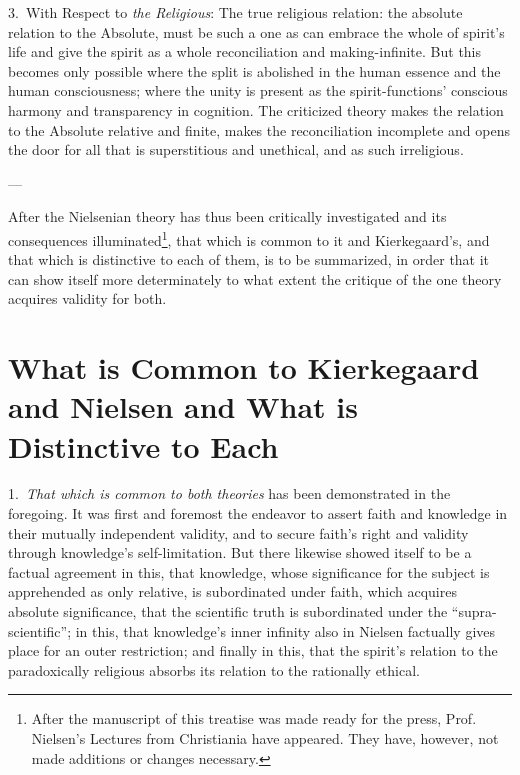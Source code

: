 \documentclass[12pt,a4paper]{book}
\begin{document}
3.~With Respect to \emph{the Religious}: The true religious relation: the absolute relation to the
Absolute, must be such a one as can embrace the whole of spirit's life and give the spirit as a whole
reconciliation and making-infinite. But this becomes only possible where the split is abolished in the
human essence and the human consciousness; where the unity is present as the spirit-functions' conscious
harmony and transparency in cognition. The criticized theory makes the relation to the Absolute relative
and finite, makes the reconciliation incomplete and opens the door for all that is superstitious and
unethical, and as such irreligious.

\begin{center}---\end{center}

After the Nielsenian theory has thus been critically investigated and its consequences
illuminated\footnote{After the manuscript of this treatise was made ready for the press, Prof. Nielsen's
Lectures from Christiania have appeared. They have, however, not made additions or changes necessary.},
that which is common to it and Kierkegaard's, and that which is distinctive to each of them, is to be
summarized, in order that it can show itself more determinately to what extent the critique of the one
theory acquires validity for both.

\section{What is Common to Kierkegaard and Nielsen and What is
  Distinctive to Each}
\label{sec:common-distinctive}

1.~\emph{That which is common to both theories} has been demonstrated in the foregoing. It was
first and foremost the endeavor to assert faith and knowledge in their mutually independent
validity, and to secure faith's right and validity through knowledge's self-limitation. But there
likewise showed itself to be a factual agreement in this, that knowledge, whose significance for
the subject is apprehended as only relative, is subordinated under faith, which acquires absolute
significance, that the scientific truth is subordinated under the ``supra-scientific''; in this,
that knowledge's inner infinity also in Nielsen factually gives place for an outer restriction; and
finally in this, that the spirit's relation to the paradoxically religious absorbs its relation to
the rationally ethical.
\end{document}
